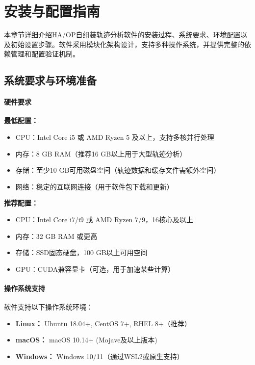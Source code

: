 
\section{安装与配置指南}
\label{sec:installation}

本章节详细介绍HA/OP自组装轨迹分析软件的安装过程、系统要求、环境配置以及初始设置步骤。软件采用模块化架构设计，支持多种操作系统，并提供完整的依赖管理和配置验证机制。

\subsection{系统要求与环境准备}
\label{subsec:system_requirements}

\paragraph{硬件要求}

\textbf{最低配置：}
\begin{itemize}
    \item CPU：Intel Core i5 或 AMD Ryzen 5 及以上，支持多核并行处理
    \item 内存：8 GB RAM（推荐16 GB以上用于大型轨迹分析）
    \item 存储：至少10 GB可用磁盘空间（轨迹数据和缓存文件需额外空间）
    \item 网络：稳定的互联网连接（用于软件包下载和更新）
\end{itemize}

\textbf{推荐配置：}
\begin{itemize}
    \item CPU：Intel Core i7/i9 或 AMD Ryzen 7/9，16核心及以上
    \item 内存：32 GB RAM 或更高
    \item 存储：SSD固态硬盘，100 GB以上可用空间
    \item GPU：CUDA兼容显卡（可选，用于加速某些计算）
\end{itemize}

\paragraph{操作系统支持}

软件支持以下操作系统环境：
\begin{itemize}
    \item \textbf{Linux：} Ubuntu 18.04+, CentOS 7+, RHEL 8+（推荐）
    \item \textbf{macOS：} macOS 10.14+ (Mojave及以上版本)
    \item \textbf{Windows：} Windows 10/11（通过WSL2或原生支持）
\end{itemize}

